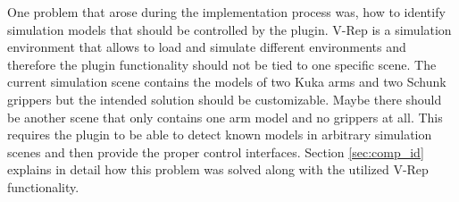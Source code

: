 One problem that arose during the implementation process was, how to identify simulation models that should be controlled by the plugin. V-Rep is a simulation environment that allows to load and simulate different environments and therefore the plugin functionality should not be tied to one specific scene. The current simulation scene contains the models of two Kuka arms and two Schunk grippers but the intended solution should be customizable. Maybe there should be another scene that only contains one arm model and no grippers at all. This requires the plugin to be able to detect known models in arbitrary simulation scenes and then provide the proper control interfaces. Section \ref{sec:comp_id} explains in detail how this problem was solved along with the utilized V-Rep functionality. \\




